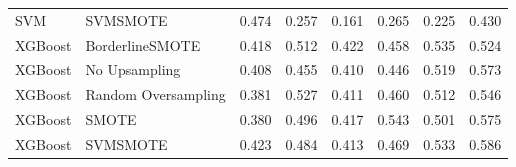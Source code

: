 \begin{tabular}{llllllll}
                            SVM &                      SVMSMOTE & 0.474 &                     0.257 &                 0.161 &                  0.265 &                                   0.225 &     0.430 \\
                        XGBoost &               BorderlineSMOTE & 0.418 &                     0.512 &                 0.422 &                  0.458 &                                   0.535 &     0.524 \\
                        XGBoost &                 No Upsampling & 0.408 &                     0.455 &                 0.410 &                  0.446 &                                   0.519 &     0.573 \\
                        XGBoost &           Random Oversampling & 0.381 &                     0.527 &                 0.411 &                  0.460 &                                   0.512 &     0.546 \\
                        XGBoost &                         SMOTE & 0.380 &                     0.496 &                 0.417 &                  0.543 &                                   0.501 &     0.575 \\
                        XGBoost &                      SVMSMOTE & 0.423 &                     0.484 &                 0.413 &                  0.469 &                                   0.533 &     0.586 \\
\bottomrule
\end{tabular}
